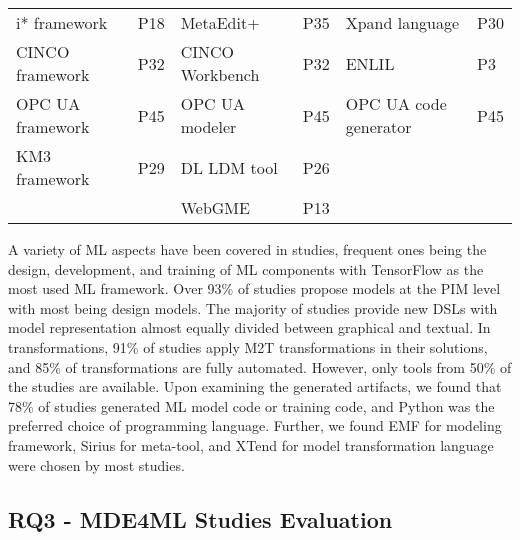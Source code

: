 \begin{table}[htbp]
\begin{tabular}{p{2.6cm} p{2.8cm} | p{2.4cm} p{2.1cm} | p{2.5cm} p{1.5cm} }
            \TBstrut i* framework \TBstrut	& P18 & MetaEdit+ & P35 & Xpand language & P30 \TBstrut \\ 

            CINCO framework \TBstrut	& P32 & CINCO Workbench   & P32 & ENLIL & P3 \TBstrut \\
                      

            OPC UA framework \TBstrut	& P45 &  OPC UA modeler & P45 & OPC UA code \mbox{generator} & P45 \TBstrut \\
                   
      KM3 framework \TBstrut	& P29 & DL LDM tool  & P26 &  &  \TBstrut \\
                     
                             \TBstrut	&  & WebGME  & P13 &  &  \TBstrut \\
            \hline
        \end{tabular}
    \label{table:metaTools}
\end{table}


\begin{center}
\begin{myframe}[width=45em,top=5pt,bottom=5pt,left=5pt,right=5pt,arc=10pt,auto outer arc,title=\centering\textbf{RQ2 Answer Summary}]
\footnotesize

A variety of ML aspects have been covered in studies, frequent ones being the design, development, and training of ML components with TensorFlow as the most used ML framework. Over 93\% of studies propose models at the PIM level with most being design models. The majority of studies provide new DSLs with model representation almost equally divided between graphical and textual. In transformations, 91\% of studies apply M2T transformations in their solutions, and 85\% of transformations are fully automated. However, only tools from 50\% of the studies are available. Upon examining the generated artifacts, we found that 78\% of studies generated ML model code or training code, and Python was the preferred choice of programming language. Further, we found EMF for modeling framework, Sirius for meta-tool, and XTend for model transformation language were chosen by most studies.
       
    \end{myframe}
\end{center}

\subsection{RQ3 - MDE4ML Studies Evaluation}
